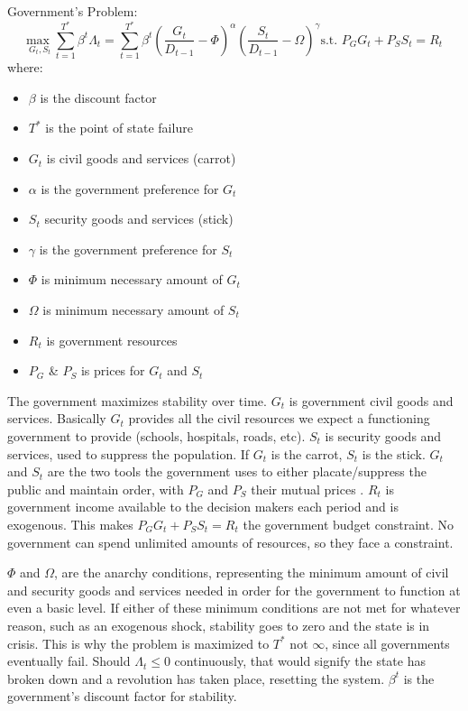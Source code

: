 \documentclass[12pt]{article}
\begin{document}
\begin{spacing}{1.5}
\vspace{.5 em}

\noindent Government's Problem:
\begin{equation}
{\underset{G_t,S_t}{\text{max }}} \sum\limits_{t=1}^{T^*} \beta^t {\Lambda}_t = \sum\limits_{t=1}^{T^*} \beta^t\left(\frac{G_t}{D_{t-1}}-\Phi\right)^\alpha \left(\frac{S_t}{D_{t-1}}-\Omega\right)^\gamma   \text{s.t. } P_G G_t+P_S S_t=R_t
\end{equation}
\noindent where:
\begin{itemize}
	\item $\beta$ is the discount factor 
	\item $T^*$ is the point of state failure 
	\item $G_t$ is civil goods and services (carrot) 
	\item $\alpha$ is the government preference for $G_t$ 
	\item $S_t$ security goods and services (stick)
	\item $\gamma$ is the government preference for $S_t$ 
	\item $\Phi$ is minimum necessary amount of $G_t$
	\item $\Omega$ is minimum necessary amount of $S_t$ 
	\item $R_t$	is government resources
	\item $P_G$ \& $P_S$ is prices for $G_t$ and $S_t$ 
\end{itemize}

The government maximizes stability over time. $G_t$ is government civil goods and services. Basically $G_t$ provides all the civil resources we expect a functioning government to provide (schools, hospitals, roads, etc). $S_t$ is security goods and services, used to suppress the population. If $G_t$ is the carrot, $S_t$ is the stick. $G_t$ and $S_t$ are the two tools the government uses to either placate/suppress the public and maintain order, with $P_G$ and $P_S$ their mutual prices . $R_t$ is government income available to the decision makers each period and is exogenous. This makes $P_G G_t+P_S S_t=R_t$ the government budget constraint. No government can spend unlimited amounts of resources, so they face a constraint. 

$\Phi$ and $\Omega$, are the anarchy conditions, representing the minimum amount of civil and security goods and services needed in order for the government to function at even a basic level. If either of these minimum conditions are not met for whatever reason, such as an exogenous shock, stability goes to zero and the state is in crisis. This is why the problem is maximized to $T^*$ not $\infty$, since all governments eventually fail. Should $\Lambda_t \leq 0$ continuously, that would signify the state has broken down and a revolution has taken place, resetting the system. $\beta^t$ is the government's discount factor for stability. 


\end{spacing}
\end{document}
